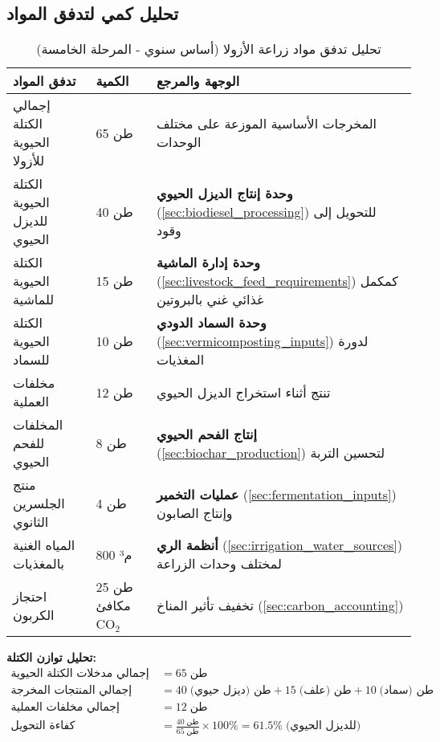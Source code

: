 \subsection{تحليل كمي لتدفق المواد}
\begin{table}[h]
\centering
\caption{تحليل تدفق مواد زراعة الأزولا (أساس سنوي - المرحلة الخامسة)}
\label{tab:azolla_material_flow}
\begin{tabular}{|p{4cm}|p{2cm}|p{8cm}|}
\hline
\textbf{تدفق المواد} & \textbf{الكمية} & \textbf{الوجهة والمرجع} \\
\hline
إجمالي الكتلة الحيوية للأزولا & 65 طن & المخرجات الأساسية الموزعة على مختلف الوحدات \\
\hline
الكتلة الحيوية للديزل الحيوي & 40 طن & \textbf{وحدة إنتاج الديزل الحيوي} (\ref{sec:biodiesel_processing}) للتحويل إلى وقود \\
\hline
الكتلة الحيوية للماشية & 15 طن & \textbf{وحدة إدارة الماشية} (\ref{sec:livestock_feed_requirements}) كمكمل غذائي غني بالبروتين \\
\hline
الكتلة الحيوية للسماد & 10 طن & \textbf{وحدة السماد الدودي} (\ref{sec:vermicomposting_inputs}) لدورة المغذيات \\
\hline
مخلفات العملية & 12 طن & تنتج أثناء استخراج الديزل الحيوي \\
\hline
المخلفات للفحم الحيوي & 8 طن & \textbf{إنتاج الفحم الحيوي} (\ref{sec:biochar_production}) لتحسين التربة \\
\hline
منتج الجلسرين الثانوي & 4 طن & \textbf{عمليات التخمير} (\ref{sec:fermentation_inputs}) وإنتاج الصابون \\
\hline
المياه الغنية بالمغذيات & 800 م³ & \textbf{أنظمة الري} (\ref{sec:irrigation_water_sources}) لمختلف وحدات الزراعة \\
\hline
احتجاز الكربون & 25 طن مكافئ CO$_2$ & تخفيف تأثير المناخ (\ref{sec:carbon_accounting}) \\
\hline
\end{tabular}
\end{table}

\textbf{تحليل توازن الكتلة:}
\begin{align*}
\text{إجمالي مدخلات الكتلة الحيوية للمعالجة} &= 65\; \text{طن} \\
\text{إجمالي المنتجات المخرجة} &= 40\; \text{طن (ديزل حيوي)} + 15\; \text{طن (علف)} + 10\; \text{طن (سماد)} \\
\text{إجمالي مخلفات العملية} &= 12\; \text{طن} \\
\text{كفاءة التحويل} &= \frac{40\; \text{طن}}{65\; \text{طن}} \times 100\% = 61.5\%\; \text{(للديزل الحيوي)}
\end{align*}

